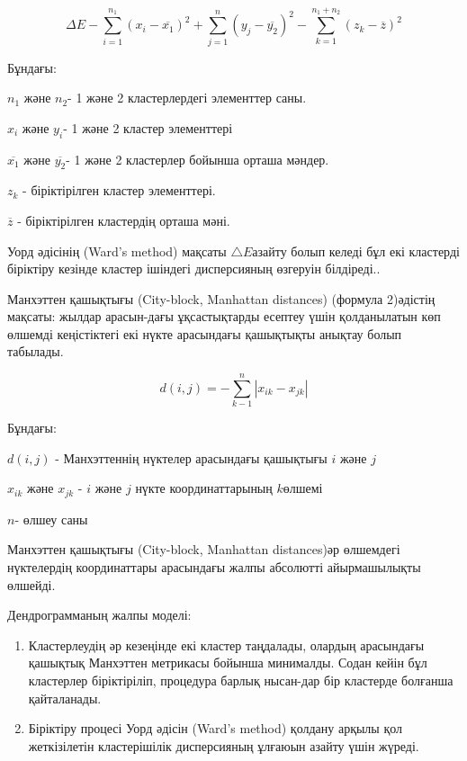 \begin{equation}
  \Delta E - \sum_{i=1}^{n_1} (x_i - \overline{x_1})^2 + \sum_{j=1}^n (y_j - \overline{y_2})^2 - \sum_{k=1}^{n_1 +n_2} (z_k - \overline{z})^2
\end{equation}

Бұндағы:

$n_1$ және $n_2$- 1 және 2 кластерлердегі элементтер
саны.

$x_i$ және $y_i$- 1 және 2 кластер элементтері

$\overline{x_1}$ және $\overline{y_2}$- 1 және 2 кластерлер бойынша орташа
мәндер.

$z_k$ - біріктірілген кластер элементтері.

$\overline{z}$ - біріктірілген кластердің орташа
мәні.

Уорд әдісінің (Ward's method) мақсаты $\triangle E$азайту болып келеді бұл екі
кластерді біріктіру кезінде кластер ішіндегі дисперсияның өзгеруін
білдіреді..

Манхэттен қашықтығы (City-block, Manhattan distances) (формула 2)әдістің
мақсаты: жылдар арасын-дағы ұқсастықтарды есептеу үшін қолданылатын көп
өлшемді кеңістіктегі екі нүкте арасындағы қашықтықты анықтау болып
табылады.

\begin{equation}
  d(i,j) = - \sum_{k-1}^n |x_{ik} - x_{jk}|
\end{equation}

Бұндағы:

$d(i,j)$ - Манхэттеннің нүктелер арасындағы
қашықтығы $i$ және $j$

$x_{ik}$ және $x_{jk}$ - $i$ және $j$ нүкте координаттарының $k$өлшемі

$n$- өлшеу саны

Манхэттен қашықтығы (City-block, Manhattan distances)әр өлшемдегі
нүктелердің координаттары арасындағы жалпы абсолютті айырмашылықты
өлшейді.

Дендрограмманың жалпы моделі:

\begin{enumerate}
\def\labelenumi{\arabic{enumi}.}\setlength{\itemindent}{1cm}
\item
  Кластерлеудің әр кезеңінде екі кластер таңдалады, олардың арасындағы
  қашықтық Манхэттен метрикасы бойынша минималды. Содан кейін бұл
  кластерлер біріктіріліп, процедура барлық нысан-дар бір кластерде
  болғанша қайталанады.
\item
  Біріктіру процесі Уорд әдісін (Ward's method) қолдану арқылы қол
  жеткізілетін кластерішілік дисперсияның ұлғаюын азайту үшін жүреді.
\end{enumerate}

